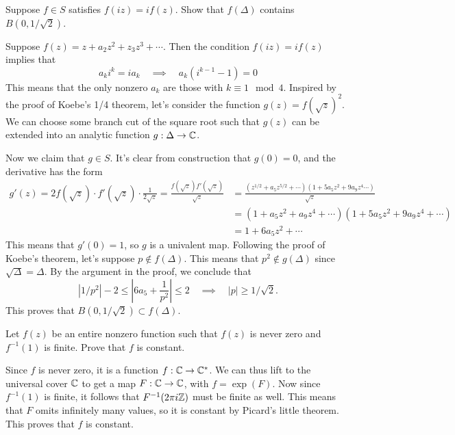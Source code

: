 \documentclass{pset}
\begin{document}
\begin{problem}{4.20}
  Suppose $f\in S$ satisfies $f(iz)=if(z)$. Show that $f(\Delta)$ contains $B(0,1/\sqrt{2})$.
\end{problem}

\begin{solution}
  Suppose $f(z) = z+a_2z^2+z_3z^3+\cdots$. Then the condition $f(iz)=if(z)$ implies that
  \[
    a_k i^k = i a_k \quad \implies \quad a_k(i^{k-1}-1) =0
  \]
  This means that the only nonzero $a_k$ are those with $k\equiv 1\mod 4$. Inspired by the proof of Koebe's 1/4 theorem, let's consider the function $g(z) = f(\sqrt{z})^2$. We can choose some branch cut of the square root such that $g(z)$ can be extended into an analytic function $g : \Delta \to \mathbb{C}$.

  Now we claim that $g\in S$. It's clear from construction that $g(0)=0$, and the derivative has the form
  \[
    \begin{aligned}
      g'(z) = 2f(\sqrt{z}) \cdot f'(\sqrt{z})\cdot \frac{1}{2\sqrt{z}} = \frac{f(\sqrt{z})f'(\sqrt{z})}{\sqrt{z}} 
      &= \frac{(z^{1/2}+ a_5z^{5/2}+\cdots) (1+5a_5z^2+9a_9z^4\cdots)}{\sqrt{z}}\\
      &= (1+a_5 z^2+a_9 z^4+\cdots)(1+5a_5z^2+9a_9z^4+\cdots)\\
      &= 1 + 6a_5z^2 + \cdots
    \end{aligned}
  \]
  This means that $g'(0)=1$, so $g$ is a univalent map. Following the proof of Koebe's theorem, let's suppose $p\not\in f(\Delta)$. This means that $p^2\not\in g(\Delta)$ since $\sqrt{\Delta} = \Delta$. By the argument in the proof, we conclude that
  \[
    |1/p^2| - 2 \leq |6a_5 + \frac{1}{p^2}| \leq 2 \quad\implies\quad |p|\geq 1/\sqrt{2}.
  \]
  This proves that $B(0,1/\sqrt{2})\subset f(\Delta)$.

\end{solution}

\begin{problem}{4.35}
  Let $f(z)$ be an entire nonzero function such that $f(z)$ is never zero and $f^{-1}(1)$ is finite. Prove that $f$ is constant.
\end{problem}

\begin{solution}
  Since $f$ is never zero, it is a function $f : \mathbb{C} \to \mathbb{C}^*$. We can thus lift to the universal cover $\mathbb{C}$ to get a map $F : \mathbb{C} \to \mathbb{C}$, with $f = \exp(F)$. Now since $f^{-1}(1)$ is finite, it follows that $F^{-1}(2\pi i \mathbb{Z})$ must be finite as well. This means that $F$ omits infinitely many values, so it is constant by Picard's little theorem. This proves that $f$ is constant.
\end{solution}
\end{document}

